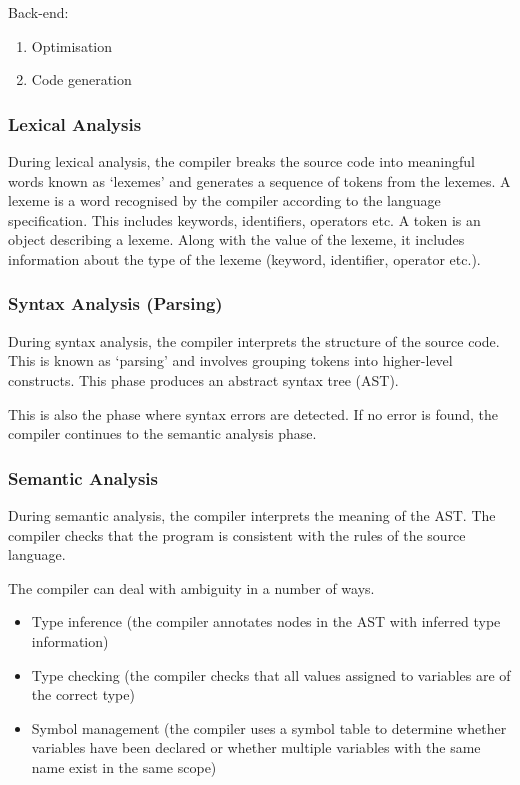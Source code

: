 Back-end:
\begin{enumerate}[resume]
  \item Optimisation
  \item Code generation
\end{enumerate}

\subsubsection{Lexical Analysis}

During lexical analysis, the compiler breaks the source code into meaningful words known as `lexemes' and generates a sequence of tokens from the lexemes.
A lexeme is a word recognised by the compiler according to the language specification.
This includes keywords, identifiers, operators etc.
A token is an object describing a lexeme.
Along with the value of the lexeme, it includes information about the type of the lexeme (keyword, identifier, operator etc.).

\subsubsection{Syntax Analysis (Parsing)}

During syntax analysis, the compiler interprets the structure of the source code.
This is known as `parsing' and involves grouping tokens into higher-level constructs.
This phase produces an abstract syntax tree (AST).

This is also the phase where syntax errors are detected.
If no error is found, the compiler continues to the semantic analysis phase.

\subsubsection{Semantic Analysis}

During semantic analysis, the compiler interprets the meaning of the AST\@.
The compiler checks that the program is consistent with the rules of the source language.

The compiler can deal with ambiguity in a number of ways.

\begin{itemize}
  \item Type inference (the compiler annotates nodes in the AST with inferred type information)
  \item Type checking (the compiler checks that all values assigned to variables are of the correct type)
  \item Symbol management (the compiler uses a symbol table to determine whether variables have been declared or whether multiple variables with the same name exist in the same scope)
\end{itemize}

